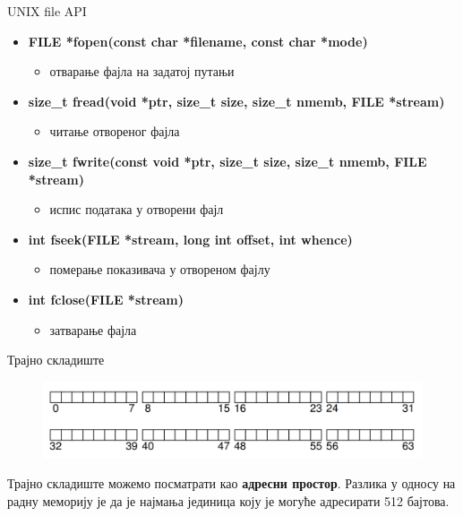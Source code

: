 \documentclass[xcolor=table]{beamer}
\begin{document}
    \begin{frame}{UNIX file API}
        \begin{itemize}
            \item \textbf{FILE *fopen(const char *filename, const char *mode)}
            \begin{itemize}
                \item отварање фајла на задатој путањи
            \end{itemize}
            \item \textbf{size\_t fread(void *ptr, size\_t size, size\_t nmemb, FILE *stream)}
            \begin{itemize}
                \item читање отвореног фајла
            \end{itemize}
            \item \textbf{size\_t fwrite(const void *ptr, size\_t size, size\_t nmemb, FILE *stream)}
            \begin{itemize}
                \item испис података у отворени фајл
            \end{itemize}
            \item \textbf{int fseek(FILE *stream, long int offset, int whence)}
            \begin{itemize}
                \item померање показивача у отвореном фајлу
            \end{itemize}
            \item \textbf{int fclose(FILE *stream)}
            \begin{itemize}
                \item затварање фајла
            \end{itemize}
        \end{itemize}
    \end{frame}
    
    \begin{frame}{Трајно складиште}
        \begin{figure}
            \includegraphics[width=\textwidth,height=0.8\textheight,keepaspectratio]{images/hdd_address_space.png}
            \label{fig:hdd_address_space.png}
        \end{figure}
        
        Трајно складиште можемо посматрати као \textbf{адресни простор}. Разлика у односу на радну меморију је да је најмања јединица коју
        је могуће адресирати 512 бајтова.
    \end{frame}
    
\end{document}
